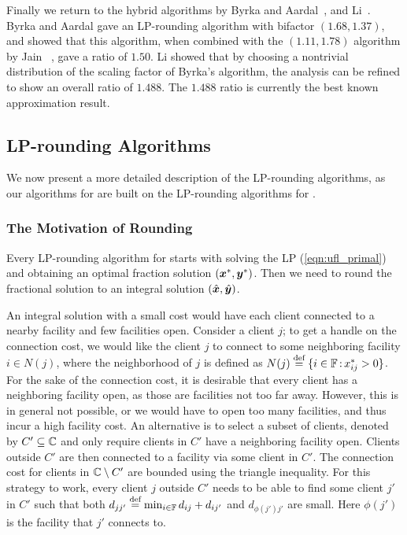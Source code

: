 \documentclass[oneside,final]{ucr}
\begin{document}
Finally we return to the hybrid algorithms by Byrka and
Aardal~\cite{ByrkaA10}, and Li~\cite{Li11}. Byrka and Aardal
gave an LP-rounding algorithm with bifactor $(1.68,1.37)$,
and showed that this algorithm, when combined with the
$(1.11,1.78)$ algorithm by Jain {\etal}~\cite{JainMMSV03},
gave a ratio of $1.50$. Li showed that by choosing a
nontrivial distribution of the scaling factor of Byrka's
algorithm, the analysis can be refined to show an overall
ratio of $1.488$. The $1.488$ ratio is currently the best
known approximation result.

\subsection{LP-rounding Algorithms}
We now present a more detailed description of the
LP-rounding algorithms, as our algorithms for {\FTFP} are
built on the LP-rounding algorithms for {\UFL}.

\subsubsection{The Motivation of Rounding}
Every LP-rounding algorithm for {\UFL} starts with solving
the LP (\ref{eqn:ufl_primal}) and obtaining an optimal
fraction solution $(\boldsymbol{x}^\ast,\boldsymbol{y}^\ast)$. Then we need to
round the fractional solution to an integral solution
$(\hat{\boldsymbol{x}},\hat{\boldsymbol{y}})$.

An integral solution with a small cost would have each
client connected to a nearby facility and few facilities
open. Consider a client $j$; to get a handle on the
connection cost, we would like the client $j$ to connect to
some neighboring facility $i\in N(j)$, where the
neighborhood of $j$ is defined as $N(j) \stackrel{\text{def}}{=}
\{i\in\mathbb{F} {\,:\,} x_{ij}^\ast > 0\}$. For the sake
of the connection cost, it is desirable that every client
has a neighboring facility open, as those are facilities not
too far away. However, this is in general not possible, or
we would have to open too many facilities, and thus incur a
high facility cost. An alternative is to select a subset of
clients, denoted by $C' \subseteq \mathbb{C}$ and only
require clients in $C'$ have a neighboring facility
open. Clients outside $C'$ are then connected to a facility
via some client in $C'$. The connection cost for clients in
$\mathbb{C} \setminus C'$ are bounded using the triangle
inequality. For this strategy to work, every client $j$
outside $C'$ needs to be able to find some client $j'$ in
$C'$ such that both $d_{jj'} \stackrel{\text{def}}{=} \min_{i\in \mathbb{F}}
d_{ij} + d_{ij'}$ and $d_{\phi(j') j'}$ are small. Here
$\phi(j')$ is the facility that $j'$ connects to.
\end{document}
